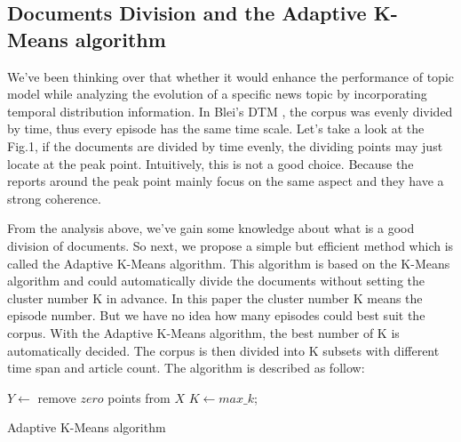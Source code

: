 \documentclass[runningheads,a4paper]{llncs}
\begin{document}
\subsection{Documents Division and the Adaptive K-Means algorithm}
\label{news documents division}
We've been thinking over that whether it would enhance the performance of topic model while analyzing the evolution of a specific news topic by incorporating temporal distribution information. In Blei's DTM \cite{Blei:2006}, the corpus was evenly divided by time, thus every episode has the same time scale. Let's take a look at the Fig.1, if the documents are divided by time evenly, the dividing points may just locate at the peak point. Intuitively, this is not a good choice. Because the reports around the peak point mainly focus on the same aspect and they have a strong coherence.

From the analysis above, we've gain some knowledge about what is a good division of documents. So next, we propose a simple but efficient method which is called the Adaptive K-Means algorithm. This algorithm is based on the K-Means algorithm\cite{kanungo2002efficient} and could automatically divide the documents without setting the cluster number K in advance. In this paper the cluster number K means the episode number. But we have no idea how many episodes could best suit the corpus. With the Adaptive K-Means algorithm, the best number of K is automatically decided. The corpus is then divided into K subsets with different time span and article count. The algorithm is described as follow:

\begin{algorithm}
  \DontPrintSemicolon
  \BlankLine
  $Y \longleftarrow$ remove $zero$ points from $X$\;
   {$K \leftarrow max\_k$;\;}
  \caption{Adaptive K-Means algorithm}
  \label{algorithm1}
\end{algorithm}
\end{document}
